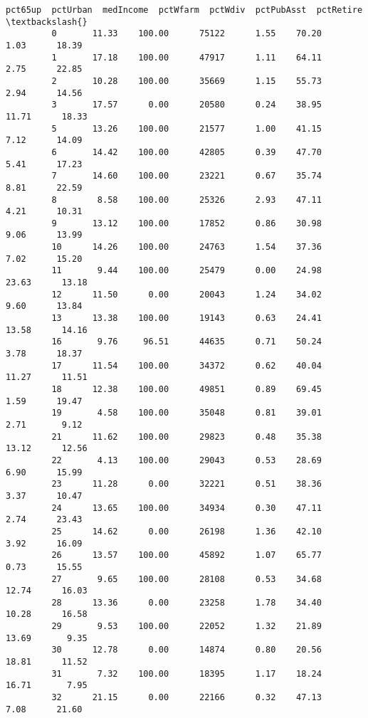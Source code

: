 \documentclass[11pt]{llncs}
\begin{document}
\begin{Verbatim}[commandchars=\\\{\}]
               pct65up  pctUrban  medIncome  pctWfarm  pctWdiv  pctPubAsst  pctRetire  \textbackslash{}
         0       11.33    100.00      75122      1.55    70.20        1.03      18.39   
         1       17.18    100.00      47917      1.11    64.11        2.75      22.85   
         2       10.28    100.00      35669      1.15    55.73        2.94      14.56   
         3       17.57      0.00      20580      0.24    38.95       11.71      18.33   
         5       13.26    100.00      21577      1.00    41.15        7.12      14.09   
         6       14.42    100.00      42805      0.39    47.70        5.41      17.23   
         7       14.60    100.00      23221      0.67    35.74        8.81      22.59   
         8        8.58    100.00      25326      2.93    47.11        4.21      10.31   
         9       13.12    100.00      17852      0.86    30.98        9.06      13.99   
         10      14.26    100.00      24763      1.54    37.36        7.02      15.20   
         11       9.44    100.00      25479      0.00    24.98       23.63      13.18   
         12      11.50      0.00      20043      1.24    34.02        9.60      13.84   
         13      13.38    100.00      19143      0.63    24.41       13.58      14.16   
         16       9.76     96.51      44635      0.71    50.24        3.78      18.37   
         17      11.54    100.00      34372      0.62    40.04       11.27      11.51   
         18      12.38    100.00      49851      0.89    69.45        1.59      19.47   
         19       4.58    100.00      35048      0.81    39.01        2.71       9.12   
         21      11.62    100.00      29823      0.48    35.38       13.12      12.56   
         22       4.13    100.00      29043      0.53    28.69        6.90      15.99   
         23      11.28      0.00      32221      0.51    38.36        3.37      10.47   
         24      13.65    100.00      34934      0.30    47.11        2.74      23.43   
         25      14.62      0.00      26198      1.36    42.10        3.92      16.09   
         26      13.57    100.00      45892      1.07    65.77        0.73      15.55   
         27       9.65    100.00      28108      0.53    34.68       12.74      16.03   
         28      13.36      0.00      23258      1.78    34.40       10.28      16.58   
         29       9.53    100.00      22052      1.32    21.89       13.69       9.35   
         30      12.78      0.00      14874      0.80    20.56       18.81      11.52   
         31       7.32    100.00      18395      1.17    18.24       16.71       7.95   
         32      21.15      0.00      22166      0.32    47.13        7.08      21.60   

\end{Verbatim}
\end{document}
